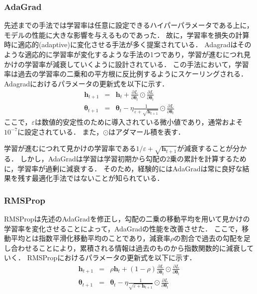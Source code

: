     \subsubsection{AdaGrad}
    先述までの手法では学習率は任意に設定できるハイパーパラメータである上に，モデルの性能に大きな影響を与えるものであった．
    故に，学習率を損失の計算時に適応的(adaptive)に変化させる手法が多く提案されている．
    Adagrad\cite{duchi2011adaptive}はそのような適応的に学習率が変化するような手法の1つであり，学習が進むにつれ見かけの学習率が減衰していくように設計されている．
    この手法において，学習率は過去の学習率の二乗和の平方根に反比例するようにスケーリングされる．
    Adagradにおけるパラメータの更新式を以下に示す．
    \begin{eqnarray}
        \boldsymbol{h}_{t+1} &=& \boldsymbol{h}_{t}+\frac{\partial L}{\partial \boldsymbol{\theta}_{t}} \odot \frac{\partial L}{\partial \boldsymbol{\theta}_{t}} \\
        \boldsymbol{\theta}_{t+1} &=& \boldsymbol{\theta}_{t}-\eta \frac{1}{\varepsilon+\sqrt{\boldsymbol{h}_{t+1}}} \odot \frac{\partial L}{\partial \boldsymbol{\theta}_{t}}
    \end{eqnarray}
    ここで，$\varepsilon$は数値的安定性のために導入されている微小値であり，通常およそ$10^{-7}$に設定されている．
    また，$\odot$はアダマール積を表す．

    学習が進むにつれて見かけの学習率である$1/\varepsilon+\sqrt{\boldsymbol{h}_{t+1}}$が減衰することが分かる．
    しかし，AdaGradは学習は学習初期から勾配の2乗の累計を計算するために，学習率が過剰に減衰する．
    そのため，経験的にはAdaGradは常に良好な結果を残す最適化手法ではないことが知られている．
    
    \subsubsection{RMSProp}
    RMSProp\cite{hinton2012neural}は先述のAdaGradを修正し，勾配の二乗の移動平均を用いて見かけの学習率を変化させることによって，AdaGradの性能を改善させた．
    ここで，移動平均とは指数平滑化移動平均のことであり，減衰率$\rho$の割合で過去の勾配を足し合わせることにより，累積される情報は過去のものから指数関数的に減衰していく．
    RMSPropにおけるパラメータの更新式を以下に示す．
    \begin{eqnarray}
        \boldsymbol{h}_{t+1} &=& \rho \boldsymbol{h}_{t}+(1-\rho) \frac{\partial L}{\partial \boldsymbol{\theta}_{t}} \odot \frac{\partial L}{\partial \boldsymbol{\theta}_{t}} \\
        \boldsymbol{\theta}_{t+1} &=& \boldsymbol{\theta}_{t}-\eta \frac{1}{\sqrt{\varepsilon+\boldsymbol{h}_{t+1}}} \odot \frac{\partial L}{\partial \boldsymbol{\theta}_{t}}
    \end{eqnarray}
    
